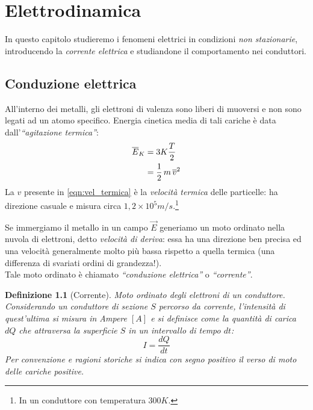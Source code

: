 \documentclass[a4paper,12pt,titlepage,openany]{book}
\theoremstyle{mydef}
\newtheorem{definizione}{Definizione}[chapter]
\begin{document}
            
            
            
    \chapter{Elettrodinamica}
        In questo capitolo studieremo i fenomeni elettrici in condizioni \emph{non stazionarie}, introducendo la \emph{corrente elettrica} e studiandone il comportamento nei conduttori.
        
        \section{Conduzione elettrica}
            All'interno dei metalli, gli elettroni di valenza sono liberi di muoversi e non sono legati ad un atomo
            specifico. Energia cinetica media di tali cariche è data dall'\emph{``agitazione termica''}:
            \begin{align}
                \overline{E}_K &= 3K\frac{T}{2} \notag \\
                &= \frac{1}{2}\,m\,\overline{v}^2 \label{eqn:vel_termica}
            \end{align}
            La $v$ presente in \ref{eqn:vel_termica} è la \emph{velocità termica} delle particelle: ha direzione casuale
            e misura circa $1,2\times 10^5 m/s$.\footnote{In un conduttore con temperatura $300K$.}
            
            Se immergiamo il metallo in un campo $\vec{E}$ generiamo un moto ordinato nella nuvola di elettroni,
            detto \emph{velocità di deriva}: essa ha una direzione ben precisa ed una velocità generalmente molto
            più bassa rispetto a quella termica (una differenza di svariati ordini di grandezza!).\\
            Tale moto ordinato è chiamato \emph{``conduzione elettrica''} o \emph{``corrente''}.
            
            \begin{definizione}[Corrente]
                Moto ordinato degli elettroni di un conduttore. Considerando un conduttore di sezione $S$ percorso da
                corrente, l'intensità di quest'ultima si misura in \emph{Ampere} $[A]$ e si definisce come la quantità
                di carica $dQ$ che attraversa la superficie $S$ in un intervallo di tempo $dt$:
                \begin{equation}
                    \boxed{I = \frac{dQ}{dt}}
                \end{equation}
                Per convenzione e ragioni storiche si indica con segno positivo il verso di moto delle cariche positive.
            \end{definizione}
            
\end{document}
